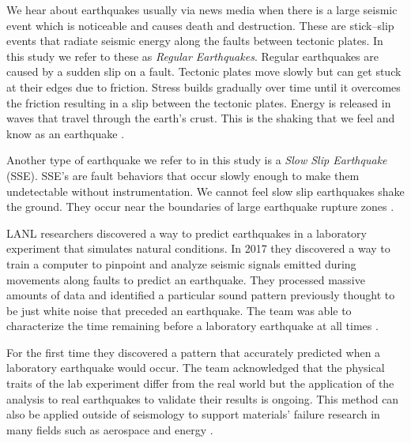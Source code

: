 \documentclass[]{llncs}
\begin{document}
We hear about earthquakes usually via news media when there is a large seismic event which is noticeable and causes death and destruction. These are stick–slip events that radiate seismic energy along the faults between tectonic plates. In this study we refer to these as {\em Regular Earthquakes}. Regular earthquakes are caused by a sudden slip on a fault. Tectonic plates move slowly but can get stuck at their edges due to friction. Stress builds gradually over time until it overcomes the friction resulting in a slip between the tectonic plates. Energy is released in waves that travel through the earth's crust. This is the shaking that we feel and know as an earthquake \cite{USGSfaqs}.
\par

Another type of earthquake we refer to in this study is a {\em Slow Slip Earthquake} (SSE). SSE's are fault behaviors that occur slowly enough to make them undetectable without instrumentation. We cannot feel slow slip earthquakes shake the ground. They occur near the boundaries of large earthquake rupture zones \cite{Slip}.
 \par

LANL researchers discovered a way to predict earthquakes in a laboratory experiment that simulates natural conditions. In 2017 they discovered a way to train a computer to pinpoint and analyze seismic signals emitted during movements along faults to predict an earthquake. They processed massive amounts of data and identified a particular sound pattern previously thought to be just white noise that preceded an earthquake. The team was able to characterize the time remaining before a laboratory earthquake at all times \cite{LANLNews}.
 \par


For the first time they discovered a pattern that accurately predicted when a laboratory earthquake would occur. The team acknowledged that the physical traits of the lab experiment differ from the real world but the application of the analysis to real earthquakes to validate their results is ongoing. This method can also be applied outside of seismology to support materials’ failure research in many fields such as aerospace and energy \cite{LANLNews}.\par
\end{document}
